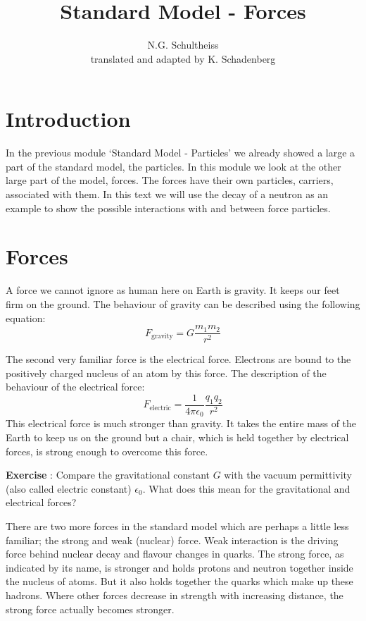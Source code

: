 \documentclass[12pt,a4paper]{article}
\author{N.G. Schultheiss \\ translated and adapted by K. Schadenberg}
\date{}
\title{Standard Model - Forces}
\numberwithin{equation}{section}
\numberwithin{figure}{section}
\newcounter{Exercise}
\numberwithin{table}{section}
\begin{document}
\maketitle

\section{Introduction}
In the previous module `Standard Model - Particles' we already showed a large a part of the standard model, the particles. In this module we look at the other large part of the model, forces. The forces have their own particles, carriers, associated with them. In this text we will use the decay of a neutron as an example to show the possible interactions with and between force particles.

\section{Forces}
A force we cannot ignore as human here on Earth is gravity. It keeps our feet firm on the ground. The behaviour of gravity can be described using the following equation:
\begin{equation}
F_{\mbox{gravity}} = G \frac{m_1 m_2}{r^2}
\end{equation}

The second very familiar force is the electrical force. Electrons are bound to the positively charged nucleus of an atom by this force. The description of the behaviour of the electrical force:
\begin{equation}
F_{\mbox{electric}} = \frac{1}{4 \pi \epsilon_0} \frac{q_1 q_2}{r^2}
\end{equation}
This electrical force is much stronger than gravity. It takes the entire mass of the Earth to keep us on the ground but a chair, which is held together by electrical forces, is strong enough to overcome this force.

\begin{shaded}
\textbf{Exercise \theExercise {}} : Compare the gravitational constant $G$ with the vacuum permittivity (also called electric constant) $\epsilon_0$. What does this mean for the gravitational and electrical forces?\end{shaded}

There are two more forces in the standard model which are perhaps a little less familiar; the strong and weak (nuclear) force. Weak interaction is the driving force behind nuclear decay and flavour changes in quarks. The strong force, as indicated by its name, is stronger and holds protons and neutron together inside the nucleus of atoms. But it also holds together the quarks which make up these hadrons. Where other forces decrease in strength with increasing distance, the strong force actually becomes stronger.
\end{document}
